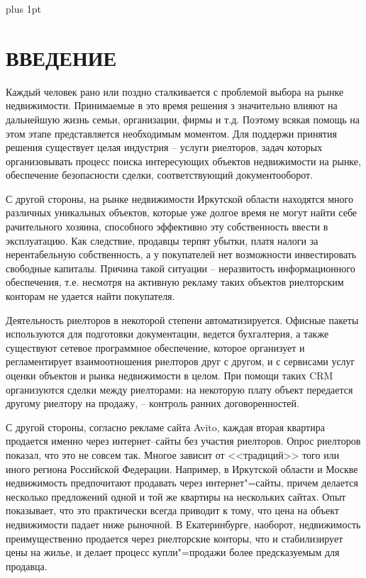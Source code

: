 \documentclass[a4paper,14pt,openany,final]{extreport} %
\date{}
\begin{document}
\parskip=0pt plus 1pt

\tableofcontents

\chapter*{ВВЕДЕНИЕ}

Каждый человек рано или поздно сталкивается с проблемой выбора на рынке недвижимости.  Принимаемые в это время решения з значительно влияют на дальнейшую жизнь семьи, организации, фирмы и т.д.
Поэтому всякая помощь на этом этапе представляется необходимым моментом.  Для поддержи принятия решения существует целая индустрия -- услуги риелторов, задач которых организовывать процесс поиска интересующих объектов недвижимости на рынке, обеспечение безопасности сделки, соответствующий документооборот.

С другой стороны, на рынке недвижимости Иркутской области находятся много различных уникальных объектов, которые уже долгое время не могут найти себе рачительного хозяина, способного эффективно эту собственность ввести в эксплуатацию.  Как следствие, продавцы терпят убытки, платя налоги за нерентабельную собственность, а у покупателей нет возможности инвестировать свободные капиталы.  Причина такой ситуации -- неразвитость информационного обеспечения, т.е. несмотря на активную рекламу таких объектов риелторским конторам не удается найти покупателя.

Деятельность риелторов в некоторой степени автоматизируется.  Офисные пакеты используются для подготовки документации, ведется бухгалтерия, а также существуют сетевое программное обеспечение, которое организует и регламентирует взаимоотношения риелторов друг с другом, и с сервисами услуг оценки объектов и рынка недвижимости в целом.  При помощи таких CRM организуются сделки между риелторами: на некоторую плату объект передается другому риелтору на продажу, -- контроль ранних договоренностей.

С другой стороны, согласно рекламе сайта Avito, каждая вторая квартира продается именно через интернет--сайты без участия риелторов.  Опрос риелторов показал, что это не совсем так.  Многое зависит от <<традиций>> того или иного региона Российской Федерации.  Например, в Иркутской области и Москве недвижимость предпочитают продавать через интернет"=сайты, причем делается несколько предложений одной и той же квартиры на нескольких сайтах.  Опыт показывает, что это практически всегда приводит к тому, что цена на объект недвижимости падает ниже рыночной.  В Екатеринбурге, наоборот, недвижимость преимущественно продается через риелторские конторы, что и стабилизирует цены на жилье, и делает процесс купли"=продажи более предсказуемым для продавца.
\end{document}
